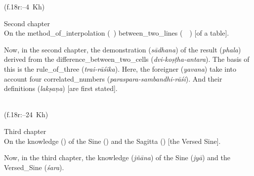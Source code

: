 \begin{multicols}{2}
\label{chapter_number_example}
\noindent\reversemarginpar{}%
\columnbreak

\noindent\normalmarginpar{}%
\enskip (f.\thinspace 18r:--4~Kh)
\end{multicols}%
%
\begin{multicols}{2}
Second chapter\\
On the \gls{method_of_interpolation} (\amal\idafaconsonant\ \tadil) 
\gls{between_two_lines} (\ma\ \bayn\ \alsatrayn) [of a table].
\columnbreak

Now, in the second chapter, the \gls{demonstration} (\textit{sādhana}) of the \gls{result} (\textit{phala}) derived from the \gls{difference_between_two_cells} (\textit{dvi-koṣṭha-antara}). The basis of this is the \gls{rule_of_three} (\textit{trai-rāśika}). Here, the foreigner (\textit{yavana}) take into account four \gls{correlated_numbers} (\textit{paraspara-sambandhi-rāśi}). And their \glspl{definition} (\textit{lakṣaṇa}) [are first stated]. 
\end{multicols}
\medskip


\begin{multicols}{2}
\noindent\reversemarginpar{}%
\columnbreak

\noindent\normalmarginpar{}%
\\
(f.\thinspace 18r:--24~Kh)
\end{multicols}%
%
\begin{multicols}{2}
Third chapter\\
On the \gls{knowledge} (\marifat) of the \gls{Sine} (\jayb) and the \gls{Sagitta} (\sahm) [\ie the Versed Sine].
\columnbreak

Now, in the third chapter, the \gls{knowledge} (\textit{jñāna}) of the \gls{Sine} (\textit{jyā}) and the \gls{Versed_Sine} (\textit{śara}).
\end{multicols}
\medskip

